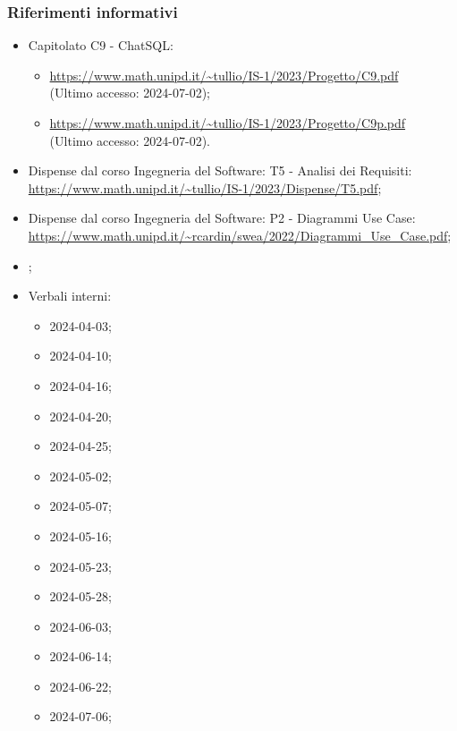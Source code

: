 \subsubsection{Riferimenti informativi}
\begin{itemize}
  \item Capitolato C9 - ChatSQL:
  \begin{itemize}
    \item \href{https://www.math.unipd.it/~tullio/IS-1/2023/Progetto/C9.pdf}{https://www.math.unipd.it/\textasciitilde tullio/IS-1/2023/Progetto/C9.pdf} \\ (Ultimo accesso: 2024-07-02);
    \item \href{https://www.math.unipd.it/~tullio/IS-1/2023/Progetto/C9p.pdf}{https://www.math.unipd.it/\textasciitilde tullio/IS-1/2023/Progetto/C9p.pdf} \\ (Ultimo accesso: 2024-07-02).
  \end{itemize}
  \item Dispense dal corso Ingegneria del Software: T5 - Analisi dei Requisiti:\\ \href{https://www.math.unipd.it/~tullio/IS-1/2023/Dispense/T5.pdf}{https://www.math.unipd.it/\textasciitilde tullio/IS-1/2023/Dispense/T5.pdf};
  \item Dispense dal corso Ingegneria del Software: P2 - Diagrammi Use Case:\\ \href{https://www.math.unipd.it/~rcardin/swea/2022/Diagrammi%20Use%20Case.pdf}{https://www.math.unipd.it/\textasciitilde rcardin/swea/2022/Diagrammi\_Use\_Case.pdf};
  \item \Glossario;
  \item Verbali interni:
  \begin{itemize}
    \item 2024-04-03;
    \item 2024-04-10;
    \item 2024-04-16;
    \item 2024-04-20;
    \item 2024-04-25;
    \item 2024-05-02;
    \item 2024-05-07;
    \item 2024-05-16;
    \item 2024-05-23;
    \item 2024-05-28;
    \item 2024-06-03;
    \item 2024-06-14;
    \item 2024-06-22;
    \item 2024-07-06;

\end{itemize}
\end{itemize}
